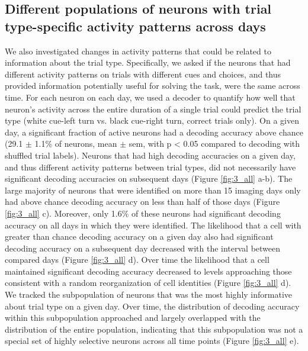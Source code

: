 \subsection{Different populations of neurons with trial type-specific activity patterns across days} \label{sec:chap3_single_cell_decoding}
We also investigated changes in activity patterns that could be related to information about the trial type. Specifically, we asked if the neurons that had different activity patterns on trials with different cues and choices, and thus provided information potentially useful for solving the task, were the same across time. For each neuron on each day, we used a decoder to quantify how well that neuron's activity across the entire duration of a single trial could predict the trial type (white cue-left turn vs. black cue-right turn, correct trials only). On a given day, a significant fraction of active neurons had a decoding accuracy above chance (29.1 $\pm$ 1.1$\%$ of neurons, mean $\pm$ sem, with p < 0.05 compared to decoding with shuffled trial labels). Neurons that had high decoding accuracies on a given day, and thus different activity patterns between trial types, did not necessarily have significant decoding accuracies on subsequent days (Figure \ref{fig:3_all} a-b). The large majority of neurons that were identified on more than 15 imaging days only had above chance decoding accuracy on less than half of those days (Figure \ref{fig:3_all} c). Moreover, only 1.6$\%$ of these neurons had significant decoding accuracy on all days in which they were identified. The likelihood that a cell with greater than chance decoding accuracy on a given day also had significant decoding accuracy on a subsequent day decreased with the interval between compared days (Figure \ref{fig:3_all} d). Over time the likelihood that a cell maintained significant decoding accuracy decreased to levels approaching those consistent with a random reorganization of cell identities (Figure \ref{fig:3_all} d). We tracked the subpopulation of neurons that was the most highly informative about trial type on a given day. Over time, the distribution of decoding accuracy within this subpopulation approached and largely overlapped with the distribution of the entire population, indicating that this subpopulation was not a special set of highly selective neurons across all time points (Figure \ref{fig:3_all} e).

